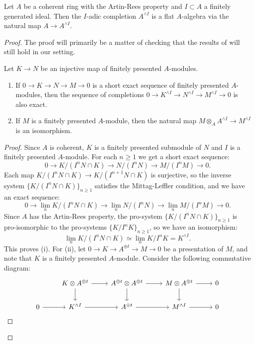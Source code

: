 \begin{theorem}\label{thm:artin-rees-completions}
Let $A$ be a coherent ring with the Artin-Rees property and $I \subset A$ a finitely generated ideal. Then the $I$-adic completion $A^{\wedge I}$ is a flat $A$-algebra via the natural map $A \to A^{\wedge I}$.
\end{theorem}
\begin{proof}
The proof will primarily be a matter of checking that the results of \cite[0BNH]{sp} will still hold in our setting.
\begin{claim}\label{claim:artin-rees}
Let $K \to N$ be an injective map of finitely presented $A$-modules.
\begin{enumerate}
\item[(i)] If $0 \to K \to N \to M \to 0$ is a short exact sequence of finitely presented $A$-modules, then the sequence of completions $0 \to K^{\wedge I} \to N^{\wedge I} \to M^{\wedge I} \to 0$ is also exact.
\item[(ii)] If $M$ is a finitely presented $A$-module, then the natural map $M \otimes_A A^{\wedge I} \to M^{\wedge I}$ is an isomorphism.
\end{enumerate}
\end{claim}
\begin{proof}
Since $A$ is coherent, $K$ is a finitely presented submodule of $N$ and $I$ is a finitely presented $A$-module. For each $n\ge 1$ we get a short exact sequence:
\[0 \to K/(I^nN \cap K) \to N/(I^n N) \to M/(I^n M) \to 0.\]
Each map $K/(I^nN \cap K) \to K/(I^{n+1}N \cap K)$ is surjective, so the inverse system $\{K/(I^nN \cap K)\}_{n \ge 1}$ satisfies the Mittag-Leffler condition, and we have an exact sequence:
\[0 \to \lim_{n} K/(I^nN \cap K) \to \lim_{n} N/(I^n N) \to \lim_{n} M/(I^n M) \to 0.\]
Since $A$ has the Artin-Rees property, the pro-system $\{K/(I^nN \cap K)\}_{n \ge 1}$ is pro-isomorphic to the pro-systems $\{K/I^n K\}_{n \ge 1}$, so we have an isomorphism:
\[\lim_{n} K/(I^nN \cap K) \simeq \lim_{n} K/I^n K = K^{\wedge I}.\]
This proves (i). For (ii), let $0 \to K \to A^{\oplus t} \to M \to 0$ be a presentation of $M$, and note that $K$ is a finitely presented $A$-module. Consider the following commutative diagram:
\[\begin{tikzcd} & K \otimes A^{\oplus t} \arrow[r] \arrow[d] & A^{\oplus t} \otimes A^{\oplus t} \arrow[r] \arrow[d] & M \otimes A^{\oplus t} \arrow[r] \arrow[d] & 0 \\
0\arrow[r]& K^{\wedge I} \arrow[r] & A^{\oplus t} \arrow[r] & M^{\wedge I} \arrow[r] & 0

\end{tikzcd}\]
\end{proof}
\end{proof}
